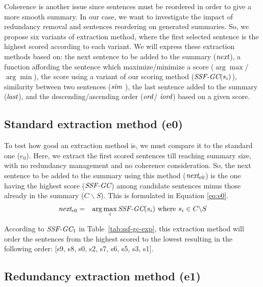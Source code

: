 Coherence is another issue since sentences must be reordered in order to give a more smooth summary. 
In our case, we want to investigate the impact of redundancy removal and sentences reordering on generated summaries. 
So, we propose six variants of extraction method, where the first selected sentence is the highest scored according to each variant.
We will express these extraction methods based on: the next sentence to be added to the summary ($ \operatorname{\textit{next}} $), a function affording the sentence which maximize/minimize a score ($ \arg\max $/$ \arg\min $), the score using a variant of our scoring method ($\operatorname{\textit{SSF-GC}}(s_i) $), similarity between two sentences ($ \operatorname{\textit{sim}} $ ), the last sentence added to the summary ($ \operatorname{\textit{last}} $), and the descending/ascending order ($ \operatorname{\textit{ord}} $/ $ \operatorname{\textit{iord}} $) based on a given score.

\subsection{Standard extraction method (e0)}

To test how good an extraction method is, we must compare it to the standard one  ($ e_0 $).
Here, we extract the first scored sentences till reaching summary size, with no redundancy management and no coherence consideration.
So, the next sentence to be added to the summary using this method ($\operatorname{\textit{next}}_{e0}$) is the one having the highest score ($ \operatorname{\textit{SSF-GC}} $) among candidate sentences minus those already in the summary ($ C\backslash S $).
This is formulated in Equation \ref{eq:e0}. 
\begin{equation}
	\begin{aligned}
		\operatorname{\textit{next}}_{e0} & = & \arg\max\limits_i \operatorname{\textit{SSF-GC}}(s_i) 
		\text{ where } s_i \in C\backslash S \\
	\end{aligned}
	\label{eq:e0}
\end{equation}

According to $ \operatorname{\textit{SSF-GC}}_1 $ in Table~\ref{tab:ssf-gc-exp}, this extraction method will order the sentences from the highest scored to the lowest resulting in the following order: 
[s9, s8, s0, s2, s7, s6, s5, s3, s1].

\subsection{Redundancy extraction method (e1)}

